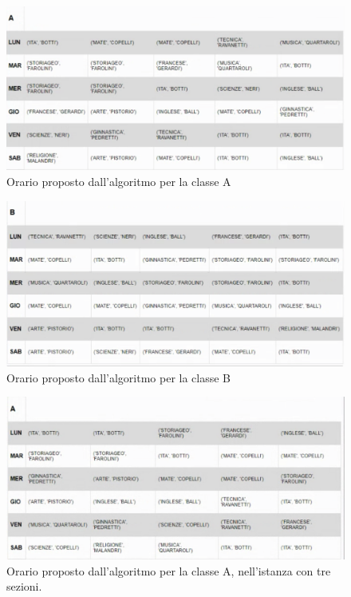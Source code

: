 \documentclass{article}
\begin{document}
\begin{figure}[H]
  \begin{center}
  \advance\leftskip-1cm
    \includegraphics[width=\columnwidth]{Classe A 2.png}
  \end{center}
  \caption[Risultato AMPL]{Orario proposto dall'algoritmo per la classe A}
  \label{fig:Risultato AMPL A_2}
\end{figure}

\begin{figure}[H]
  \begin{center}
  \advance\leftskip-1cm
    \includegraphics[width=\columnwidth]{Classe B 2.png}
  \end{center}
  \caption[Risultato AMPL]{Orario proposto dall'algoritmo per la classe B}
  \label{fig:Risultato AMPL B_2}
\end{figure}


\begin{figure}[H]
  \begin{center}
  \advance\leftskip-1cm
    \includegraphics[width=\columnwidth]{Classe A 3.png}
  \end{center}
  \caption[Risultato AMPL]{Orario proposto dall'algoritmo per la classe A, nell'istanza con tre sezioni.}
  \label{fig:Risultato AMPL A_3}
\end{figure}
\end{document}
